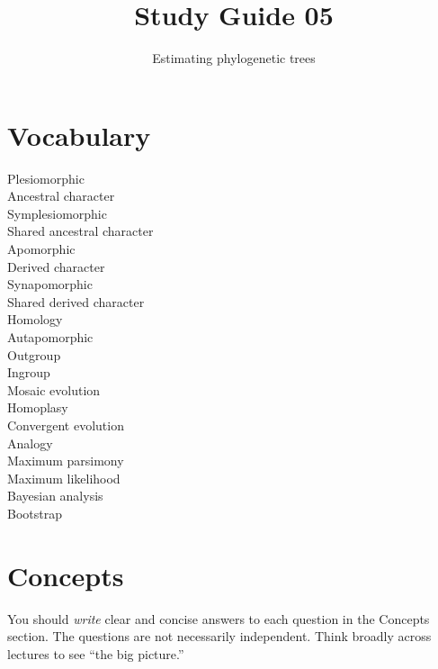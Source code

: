 \documentclass[letterpaper]{tufte-handout}
\title{Study Guide 05\hfill}
\author{Estimating phylogenetic trees}
\date{} %
\begin{document}
\maketitle	%

\section{Vocabulary}

\begin{multicols}{2}
Plesiomorphic\\
Ancestral character \\
Symplesiomorphic \\
Shared ancestral character \\
Apomorphic \\
Derived character \\
Synapomorphic \\
Shared derived character \\
Homology \\
Autapomorphic \\
Outgroup \\
Ingroup \\
Mosaic evolution \\
Homoplasy \\
Convergent evolution \\
Analogy \\
Maximum parsimony \\
Maximum likelihood \\
Bayesian analysis \\
Bootstrap \\
\end{multicols}


\section{Concepts}

You should \emph{write} clear and concise answers to each question in the Concepts section.  The questions are not necessarily independent.  Think broadly across lectures to see ``the big picture.'' 
\end{document}
